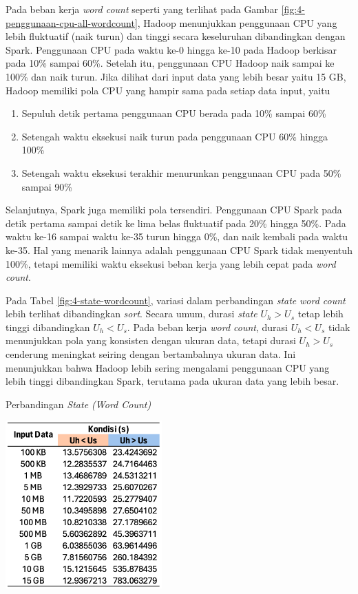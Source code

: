 Pada beban kerja \textit{word count} seperti yang terlihat pada Gambar \ref{fig:4-penggunaan-cpu-all-wordcount}, Hadoop menunjukkan penggunaan CPU yang lebih fluktuatif (naik turun) dan tinggi secara keseluruhan dibandingkan dengan Spark. Penggunaan CPU pada waktu ke-0 hingga ke-10 pada Hadoop berkisar pada 10\% sampai 60\%. Setelah itu, penggunaan CPU Hadoop naik sampai ke 100\% dan naik turun. Jika dilihat dari input data yang lebih besar yaitu 15 GB, Hadoop memiliki pola CPU yang hampir sama pada setiap data input, yaitu 
\begin{enumerate}
\item Sepuluh detik pertama penggunaan CPU berada pada 10\% sampai 60\%
\item Setengah waktu eksekusi naik turun pada penggunaan CPU 60\% hingga 100\%
\item Setengah waktu eksekusi terakhir menurunkan penggunaan CPU pada 50\% sampai 90\%
\end{enumerate}
Selanjutnya, Spark juga memiliki pola tersendiri. Penggunaan CPU Spark pada detik pertama sampai detik ke lima belas fluktuatif pada 20\% hingga 50\%. Pada waktu ke-16 sampai waktu ke-35 turun hingga 0\%, dan naik kembali pada waktu ke-35. Hal yang menarik lainnya adalah penggunaan CPU Spark tidak menyentuh 100\%, tetapi memiliki waktu eksekusi beban kerja yang lebih cepat pada \textit{word count}.

Pada Tabel \ref{fig:4-state-wordcount}, variasi dalam perbandingan \textit{state} \textit{word count} lebih terlihat dibandingkan  \textit{sort}. Secara umum, durasi \textit{state} $U_h > U_s$ tetap lebih tinggi dibandingkan $U_h < U_s$. Pada beban kerja \textit{word count}, durasi $U_h < U_s$ tidak menunjukkan pola yang konsisten dengan ukuran data, tetapi durasi $U_h > U_s$ cenderung meningkat seiring dengan bertambahnya ukuran data. Ini menunjukkan bahwa Hadoop lebih sering mengalami penggunaan CPU yang lebih tinggi dibandingkan Spark, terutama pada ukuran data yang lebih besar.

\begin{table}[h]
  \centering
  \caption{Perbandingan \textit{State  (Word Count)}}
  \includegraphics[width=0.45\textwidth]{figures/ch04/4-kondisi-wc}
  \label{fig:4-state-wordcount}
\end{table}


